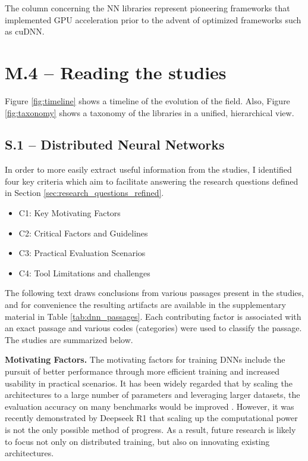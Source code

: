 The column concerning the NN libraries \cite{Jia.EtAl_2014a,krizhevsky_imagenet_2012,
	Goodfellow.EtAl_2013,Collobert.EtAl_} represent pioneering frameworks that implemented GPU
acceleration prior to the advent of optimized frameworks such as cuDNN.

\section{M.4 -- Reading the studies}
\label{sec:reading-studies}
Figure \ref{fig:timeline} shows a timeline of the evolution of the field. Also, Figure \ref{fig:taxonomy}
shows a taxonomy of the libraries in a unified, hierarchical view.

\subsection{S.1 -- Distributed Neural Networks}
\label{sec:dnn-studies}

In order to more easily extract useful information from the studies, I identified four key criteria
which aim to facilitate answering the research questions defined in Section
\ref{sec:research_questions_refined}.

\begin{itemize}
	\item C1: Key Motivating Factors
	\item C2: Critical Factors and Guidelines
	\item C3: Practical Evaluation Scenarios
	\item C4: Tool Limitations and challenges
\end{itemize}

The following text draws conclusions from various passages present in the studies, and for
convenience the resulting artifacts are available in the supplementary material in Table
\ref{tab:dnn_passages}. Each contributing factor is associated with an exact passage and various
codes (categories) were used to classify the passage. The studies are summarized below.

\textbf{Motivating Factors.}
The motivating factors for training DNNs include the pursuit of better performance through more
efficient training and increased usability in practical scenarios. It has been widely regarded that
by scaling the architectures to a large number of parameters and leveraging larger datasets, the
evaluation accuracy on many benchmarks would be improved \cite{hestness_deep_2017}. However, it was
recently demonstrated by Deepseek R1
\cite{deepseekai2025deepseekr1incentivizingreasoningcapability} that scaling up the computational
power is not the only possible method of progress. As a result, future research is likely to focus
not only on distributed training, but also on innovating existing architectures.

